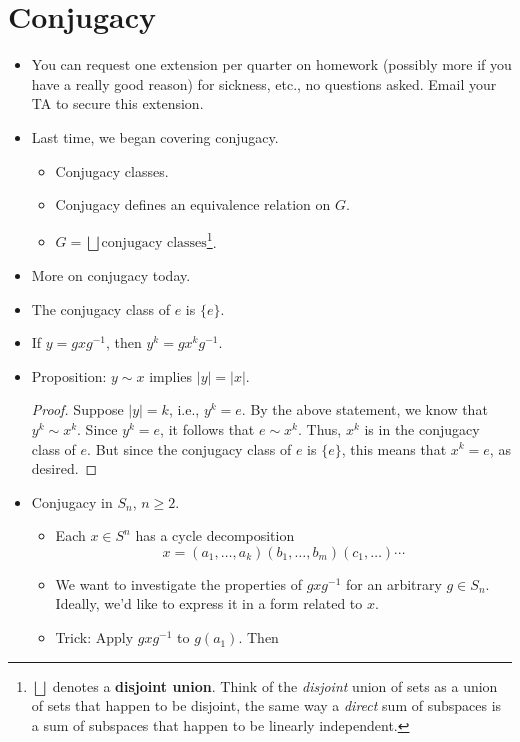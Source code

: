 \documentclass[../notes.tex]{subfiles}
\begin{document}
\section{Conjugacy}
\begin{itemize}
    \item {}You can request one extension per quarter on homework (possibly more if you have a really good reason) for sickness, etc., no questions asked. Email your TA to secure this extension.
    \item Last time, we began covering conjugacy.
    \begin{itemize}
        \item Conjugacy classes.
        \item Conjugacy defines an equivalence relation on $G$.
        \item $G=\bigsqcup\text{conjugacy classes}$\footnote{$\bigsqcup$ denotes a \textbf{disjoint union}. Think of the \emph{disjoint} union of sets as a union of sets that happen to be disjoint, the same way a \emph{direct} sum of subspaces is a sum of subspaces that happen to be linearly independent.}.
    \end{itemize}
    \item More on conjugacy today.
    \item The conjugacy class of $e$ is $\{e\}$.
    \item If $y=gxg^{-1}$, then $y^k=gx^kg^{-1}$.
    \item Proposition: $y\sim x$ implies $|y|=|x|$.
    \begin{proof}
        Suppose $|y|=k$, i.e., $y^k=e$. By the above statement, we know that $y^k\sim x^k$. Since $y^k=e$, it follows that $e\sim x^k$. Thus, $x^k$ is in the conjugacy class of $e$. But since the conjugacy class of $e$ is $\{e\}$, this means that $x^k=e$, as desired.
    \end{proof}
    \item Conjugacy in $S_n$, $n\geq 2$.
    \begin{itemize}
        \item Each $x\in S^n$ has a cycle decomposition
        \begin{equation*}
            x = (a_1,\dots,a_k)(b_1,\dots,b_m)(c_1,\dots)\cdots
        \end{equation*}
        \item We want to investigate the properties of $gxg^{-1}$ for an arbitrary $g\in S_n$. Ideally, we'd like to express it in a form related to $x$.
        \item Trick: Apply $gxg^{-1}$ to $g(a_1)$. Then

\end{itemize}
\end{itemize}
\end{document}
